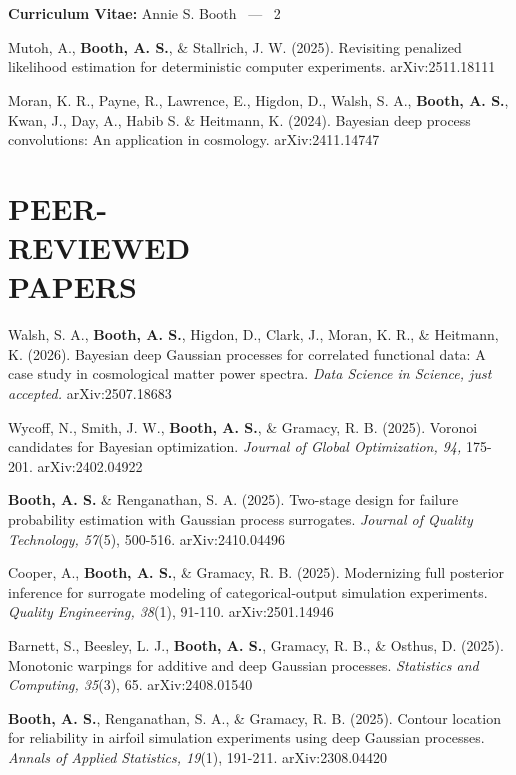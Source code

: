 \documentclass[margin,line,11pt]{res}
\begin{document}
\begin{resume}
\pagebreak
\section{}
\hfill {\bf Curriculum Vitae:} Annie S. Booth \  --- \  2
\medskip

Mutoh, A., {\bf Booth, A. S.}, \& Stallrich, J. W. (2025). Revisiting penalized likelihood 
estimation for deterministic computer experiments. arXiv:2511.18111

Moran, K. R., Payne, R., Lawrence, E., Higdon, D., Walsh, S. A., {\bf Booth, A. S.}, 
Kwan, J., Day, A., 
Habib S. \& Heitmann, K. (2024). Bayesian deep process convolutions: An application 
in cosmology. arXiv:2411.14747

\medskip
\section{\bf{PEER- \\ REVIEWED \\ PAPERS}}

Walsh, S. A., {\bf Booth, A. S.}, Higdon, D., Clark, J., Moran, K. R., \& Heitmann, K. (2026). 
Bayesian deep Gaussian processes for correlated functional data: A case study in cosmological 
matter power spectra. {\it Data Science in Science, just accepted.} arXiv:2507.18683

Wycoff, N., Smith, J. W., {\bf Booth, A. S.}, \& Gramacy, R. B. (2025). Voronoi 
candidates for Bayesian optimization. {\it Journal of Global Optimization, 94,} 
175-201. arXiv:2402.04922

{\bf Booth, A. S.} \& Renganathan, S. A. (2025). Two-stage design for failure 
probability estimation with Gaussian process surrogates. 
{\it Journal of Quality Technology, 57}(5), 500-516. arXiv:2410.04496

Cooper, A., {\bf Booth, A. S.}, \& Gramacy, R. B. (2025). Modernizing full 
posterior inference for surrogate modeling of categorical-output simulation 
experiments. {\it Quality Engineering, 38}(1), 91-110. arXiv:2501.14946

Barnett, S., Beesley, L. J., {\bf Booth, A. S.}, Gramacy, R. B., \& Osthus, D. 
(2025). Monotonic warpings for additive and deep Gaussian processes. 
{\it Statistics and Computing, 35}(3), 65. arXiv:2408.01540

{\bf Booth, A. S.}, Renganathan, S. A., \& Gramacy, R. B. (2025). Contour location
for reliability in airfoil simulation experiments using deep Gaussian
processes.  {\it Annals of Applied Statistics, 19}(1), 191-211. arXiv:2308.04420


\end{resume}
\end{document}
